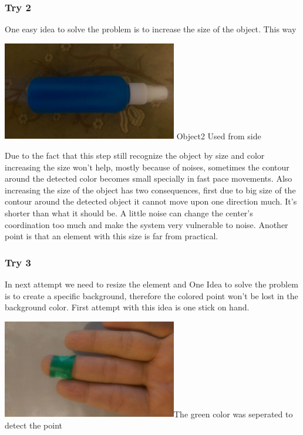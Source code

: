 \documentclass{report}
\begin{document}
\subsubsection{Try 2}
One easy idea to solve the problem is to increase the size of the object. This way 
\begin{center}
	\includegraphics[width=3in]{Object2.jpg} \newline \figurename{Object2} Used from side 
\end{center}
Due to the fact that this step still recognize the object by size and color increasing the size won't help, mostly because of noises, sometimes the contour around the detected color becomes small specially in fast pace movements. Also increasing the size of the object has two consequences, first due to big size of the contour around the detected object it cannot move upon one direction much. It's shorter than what it should be. A little noise can change the center's coordination too much and make the system very vulnerable to noise. Another point is that an element with this size is far from practical. 
\subsubsection{Try 3}
In next attempt we need to resize the element and 
One Idea to solve the problem is to create a specific background, therefore the colored point won't be lost in the background color. First attempt with this idea is one stick on hand. \newline
\begin{center}
	\includegraphics[width=3in]{Object3.jpg}\newline \figurename{The green color was seperated to detect the point}
\end{center}
\end{document}
